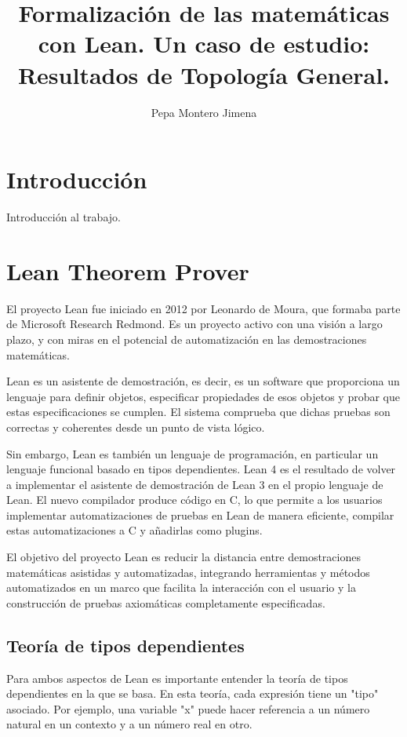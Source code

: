 \documentclass{article}
\title{Formalización de las matemáticas con Lean. Un caso de estudio: Resultados de Topología General.}
\author{Pepa Montero Jimena}
\date{}
\begin{document}
\maketitle

\section{Introducción}

Introducción al trabajo.

\section{Lean Theorem Prover}

El proyecto Lean fue iniciado en 2012 por Leonardo de Moura, que formaba parte de Microsoft Research Redmond. Es un proyecto activo con una visión a largo plazo, y con miras en el potencial de automatización en las demostraciones matemáticas.\cite{avigad2015theorem}

Lean es un asistente de demostración, es decir, es un software que proporciona un lenguaje para definir objetos, especificar propiedades de esos objetos y probar que estas especificaciones se cumplen. El sistema comprueba que dichas pruebas son correctas y coherentes desde un punto de vista lógico. \cite{leanprover2024} 

Sin embargo, Lean es también un lenguaje de programación, en particular un lenguaje funcional basado en tipos dependientes. Lean 4 es el resultado de volver a implementar el asistente de demostración de Lean 3 en el propio lenguaje de Lean. El nuevo compilador produce código en C, lo que permite a los usuarios implementar automatizaciones de pruebas en Lean de manera eficiente, compilar estas automatizaciones a C y añadirlas como plugins\cite{moura2021lean}.

El objetivo del proyecto Lean es reducir la distancia entre demostraciones matemáticas asistidas y automatizadas, integrando herramientas y métodos automatizados en un marco que facilita la interacción con el usuario y la construcción de pruebas axiomáticas completamente especificadas\cite{avigad2015theorem}.

\subsection{Teoría de tipos dependientes}

Para ambos aspectos de Lean es importante entender la teoría de tipos dependientes en la que se basa. En esta teoría, cada expresión tiene un "tipo" asociado. Por ejemplo, una variable "x" puede hacer referencia a un número natural en un contexto y a un número real en otro.
\end{document}
